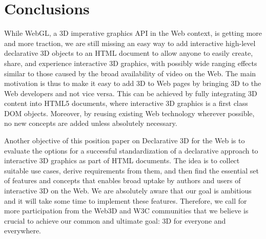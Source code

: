 \documentclass{acmsiggraph}
\begin{document}
\section{Conclusions}
\label{sec:Conclusions}

While WebGL, a 3D imperative graphics API in the Web context, is getting more and more traction, we are still missing an easy way to add interactive high-level declarative 3D objects to an HTML document to allow anyone to easily create, share, and experience interactive 3D graphics, with possibly wide ranging effects similar to those caused by the broad availability of video on the Web.
The main motivation is thus to make it easy to add 3D to Web pages by bringing 3D to the Web developers and not vice versa. This can be achieved by fully integrating 3D content into HTML5 documents, where interactive 3D graphics is a first class DOM objects. Moreover, by reusing existing Web technology wherever possible, no new concepts are added unless absolutely necessary.

Another objective of this position paper on Declarative 3D for the Web is to evaluate the options for a successful standardization of a declarative approach to interactive 3D graphics as part of HTML documents. The idea is to collect suitable use cases, derive requirements from them, and then find the essential set of features and concepts that enables broad uptake by authors and users of interactive 3D on the Web.
We are absolutely aware that our goal is ambitious and it will take some time to implement these features. Therefore, we call for more participation from the Web3D and W3C communities that we believe is crucial to achieve our common and ultimate goal: 3D for everyone and everywhere.





\end{document}

